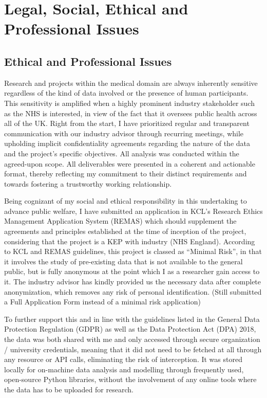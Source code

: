 \section{Legal, Social, Ethical and Professional Issues}

\subsection{Ethical and Professional Issues}
\noindent Research and projects within the medical domain are always inherently sensitive regardless of the kind of data involved or the presence of human participants. This sensitivity is amplified when a highly prominent industry stakeholder such as the NHS is interested, in view of the fact that it oversees public health across all of the UK. Right from the start, I have prioritized regular and transparent communication with our industry advisor through recurring meetings, while upholding implicit confidentiality agreements regarding the nature of the data and the project’s specific objectives. All analysis was conducted within the agreed-upon scope. All deliverables were presented in a coherent and actionable format, thereby reflecting my commitment to their distinct requirements and towards fostering a trustworthy working relationship.

\vspace{5pt}
\noindent Being cognizant of my social and ethical responsibility in this undertaking to advance public welfare, I have submitted an application in KCL’s Research Ethics Management Application System (REMAS) which should supplement the agreements and principles established at the time of inception of the project, considering that the project is a KEP with industry (NHS England). According to KCL and REMAS guidelines, this project is classed as “Minimal Risk”, in that it involves the study of pre-existing data that is not available to the general public, but is fully anonymous at the point which I as a researcher gain access to it. The industry advisor has kindly provided us the necessary data after complete anonymization, which removes any risk of personal identification. (Still submitted a Full Application Form instead of a minimal risk application)

\vspace{5pt}
\noindent To further support this and in line with the guidelines listed in the General Data Protection Regulation (GDPR) as well as the Data Protection Act (DPA) 2018, the data was both shared with me and only accessed through secure organization / university credentials, meaning that it did not need to be fetched at all through any resource or API calls, eliminating the risk of interception. It was stored locally for on-machine data analysis and modelling through frequently used, open-source Python libraries, without the involvement of any online tools where the data has to be uploaded for research.

